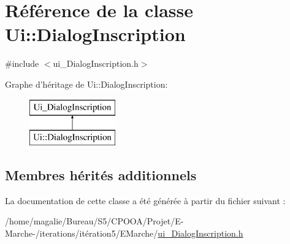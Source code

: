 \hypertarget{class_ui_1_1_dialog_inscription}{\section{Référence de la classe Ui\-:\-:Dialog\-Inscription}
\label{class_ui_1_1_dialog_inscription}
}


{\ttfamily \#include $<$ui\-\_\-\-Dialog\-Inscription.\-h$>$}

Graphe d'héritage de Ui\-:\-:Dialog\-Inscription\-:\begin{figure}[H]
\begin{center}
\leavevmode
\includegraphics[height=2.000000cm]{class_ui_1_1_dialog_inscription}
\end{center}
\end{figure}
\subsection*{Membres hérités additionnels}


La documentation de cette classe a été générée à partir du fichier suivant \-:\begin{DoxyCompactItemize}
\item 
/home/magalie/\-Bureau/\-S5/\-C\-P\-O\-O\-A/\-Projet/\-E-\/\-Marche-\//iterations/itération5/\-E\-Marche/\hyperlink{ui___dialog_inscription_8h}{ui\-\_\-\-Dialog\-Inscription.\-h}\end{DoxyCompactItemize}
